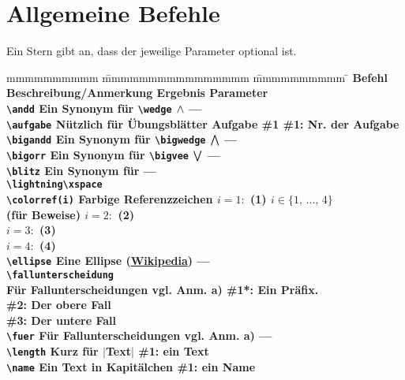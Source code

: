 		\section{Allgemeine Befehle}
			Ein Stern gibt an, dass der jeweilige Parameter optional ist. 
			\begin{tabbing}
				mmmmmmmmmm			\= mmmmmmmmmmmmmmmm							\= mmmmmmmmmm			\= \kill
				\bf Befehl			\> \bf Beschreibung/Anmerkung				\> \bf Ergebnis 		\> \bf Parameter 					\\
				\verb|\andd|		\> Ein Synonym für \verb|\wedge|			\> $\wedge$ 				\> ---								\\
				\verb|\aufgabe|		\> Nützlich für Übungsblätter				\> Aufgabe \#1 			\> \#1: Nr. der Aufgabe 			\\
				\verb|\bigandd|		\> Ein Synonym für \verb|\bigwedge|			\> $\bigwedge$ 			\> --- 								\\
				\verb|\bigorr|		\> Ein Synonym für \verb|\bigvee|			\> $\bigvee$ 			\> --- 								\\
				\verb|\blitz|		\> Ein Synonym für							\> \lightning\xspace 	\> ---								\\
									\> \verb|\lightning\xspace|																				\\
				\verb|\colorref(i)|	\> Farbige Referenzzeichen					\> $i=1:$ (1)	\> $i \in \{1, \, \ldots, \, 4\}$	\\
									\>(\zb für Beweise)							\> $i=2:$ \colorref(2)										\\
									\>											\> $i=3:$ (3)										\\
									\>											\> $i=4:$ (4)										\\
				\verb|\ellipse|		\> Eine Ellipse	 (\href{https://de.wikipedia.org/wiki/Auslassungspunkte}{Wikipedia})
									\> \ellipse				\> ---							\\
				\verb|\fallunterscheidung|\\
									\> Für Fallunterscheidungen					\> vgl. Anm. a)			\> \#1*: Ein Präfix.				\\
									\>											\>						\> \#2: Der obere Fall				\\
									\>											\>						\> \#3: Der untere Fall				\\
				\verb|\fuer|		\> Für Fallunterscheidungen					\> vgl. Anm. a)			\> ---								\\
				\verb|\length|		\> Kurz für $|$Text$|$						\> \length{Text}		\> \#1: ein Text					\\
				\verb|\name|		\> Ein Text in Kapitälchen					\> \name{Der Autor}		\> \#1: ein Name					\\

\end{tabbing}

